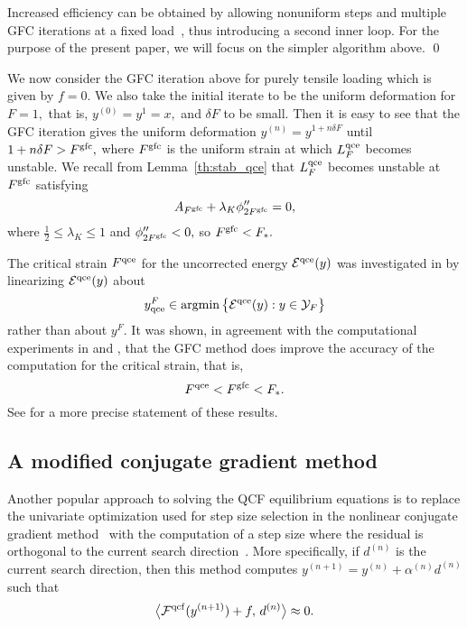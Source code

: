 \documentclass[12pt,reqno]{amsart}
\newcounter{remark}
\newenvironment{remark}[1][!]{{\refstepcounter{remark}\bigskip
{\noindent \it \bfseries{Remark}~\theremark\if{#1}!{. }\else{ ({#1}). }\fi}}}{\qed}
\begin{document}
\begin{remark}
  Increased efficiency can be obtained by allowing nonuniform steps
  and multiple GFC iterations at a fixed load~\cite{dobsonluskin08},
  thus introducing a second inner loop. For the purpose of the present
  paper, we will focus on the simpler algorithm above.
\end{remark}

\medskip
We now consider the GFC iteration above for purely
tensile loading which is given by $f=0.$  We also take the initial
iterate to be the uniform deformation for $F=1,$ that is, $y^{(0)}=y^1=x,$
and $\delta F$ to be small.
Then it is easy to see that the GFC iteration gives the uniform deformation
$y^{(n)}=y^{1+n\delta F}$ until $1+n\delta F>F^{\rm gfc},$ where
$F^{\rm gfc}$ is the uniform strain at which ${L^{{\rm qce}}_F}$ becomes
unstable.  We recall from Lemma~\ref{th:stab_qce} that ${L^{{\rm qce}}_F}$ becomes
unstable at $F^{\rm gfc}$ satisfying
\[
A_{F^{\rm gfc}} + \lambda_K \phi_{2F^{\rm gfc}}''=0,
\]
where ${{\textstyle \frac{1}{2}}} \leq \lambda_K \leq 1$ and
$\phi_{2F^{\rm gfc}}''<0,$ so $F^{\rm gfc}<F_*.$

The critical strain $F^{\rm qce}$ for the uncorrected  energy
${{\mathcal{E}}^{{\rm qce}}}(y)$ was
investigated in \cite{doblusort:qce.stab} by linearizing ${{\mathcal{E}}^{{\rm qce}}}(y)$
about
\[
y_{\rm qce}^F\in {{\rm argmin}} \,
  \big\{{{\mathcal{E}}^{{\rm qce}}}(y)  : y \in {\mathcal{Y}}_{F} \big\}
  \]
rather than about $y^F.$  It was shown, in agreement with the
computational experiments in \cite{doblusort:qce.stab}
and \cite{Miller:2008}, that the GFC method
does improve the accuracy of the computation for the critical strain,
that is,
\[
F^{\rm qce}<F^{\rm gfc}<F_*.
\]
  See \cite{doblusort:qce.stab}
for a more precise statement of these results.

\subsection{A modified conjugate gradient method}
\label{sec:modifiedcg}
Another popular approach to solving the QCF equilibrium equations is
to replace the univariate optimization used for step size selection in
the nonlinear conjugate gradient method~\cite{NocedalWright99} with
the computation of a step size where the residual is orthogonal to the
current search direction~\cite{Miller:2008}.
More specifically, if $d^{(n)}$ is the current search direction, then
this method computes $y^{(n+1)} = y^{(n)}+\alpha^{(n)} d^{(n)}$ such
that
\begin{equation} \label{miller}
  \big{\langle}{\mathcal{F}}^{\rm qcf}(y^{(n+1)}) + f,\, d^{(n)}\big{\rangle} \approx 0.
\end{equation}
\end{document}
